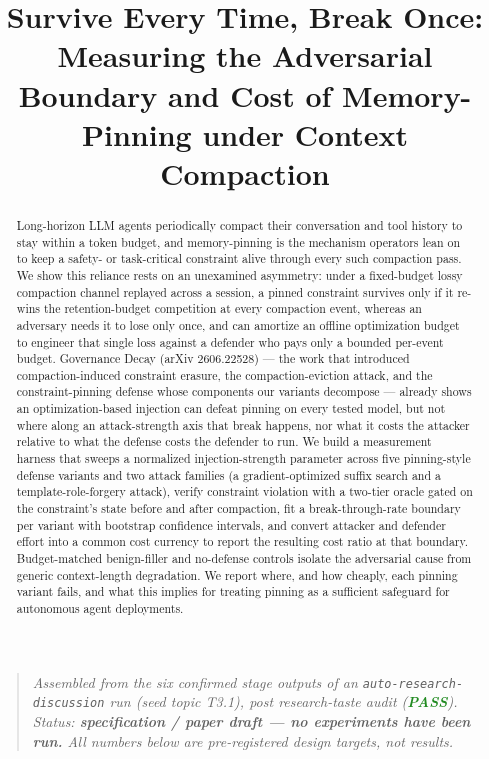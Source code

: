 \documentclass[11pt]{article}
\title{\textbf{Survive Every Time, Break Once:\\ Measuring the Adversarial Boundary and Cost of Memory-Pinning under Context Compaction}}
\author{}
\date{}
\begin{document}
\maketitle
\vspace{-2em}

\begin{quote}
\small\textit{Assembled from the six confirmed stage outputs of an \texttt{auto-research-discussion} run (seed topic T3.1), post research-taste audit (\textcolor{ForestGreen}{\textbf{PASS}}). Status: \textbf{specification / paper draft --- no experiments have been run.} All numbers below are pre-registered design targets, not results.}
\end{quote}

\begin{abstract}
Long-horizon LLM agents periodically compact their conversation and tool history to stay within a token budget, and memory-pinning is the mechanism operators lean on to keep a safety- or task-critical constraint alive through every such compaction pass. We show this reliance rests on an unexamined asymmetry: under a fixed-budget lossy compaction channel replayed across a session, a pinned constraint survives only if it re-wins the retention-budget competition at every compaction event, whereas an adversary needs it to lose only once, and can amortize an offline optimization budget to engineer that single loss against a defender who pays only a bounded per-event budget. Governance Decay (arXiv 2606.22528) --- the work that introduced compaction-induced constraint erasure, the compaction-eviction attack, and the constraint-pinning defense whose components our variants decompose --- already shows an optimization-based injection can defeat pinning on every tested model, but not where along an attack-strength axis that break happens, nor what it costs the attacker relative to what the defense costs the defender to run. We build a measurement harness that sweeps a normalized injection-strength parameter across five pinning-style defense variants and two attack families (a gradient-optimized suffix search and a template-role-forgery attack), verify constraint violation with a two-tier oracle gated on the constraint's state before and after compaction, fit a break-through-rate boundary per variant with bootstrap confidence intervals, and convert attacker and defender effort into a common cost currency to report the resulting cost ratio at that boundary. Budget-matched benign-filler and no-defense controls isolate the adversarial cause from generic context-length degradation. We report where, and how cheaply, each pinning variant fails, and what this implies for treating pinning as a sufficient safeguard for autonomous agent deployments.
\end{abstract}
\end{document}
